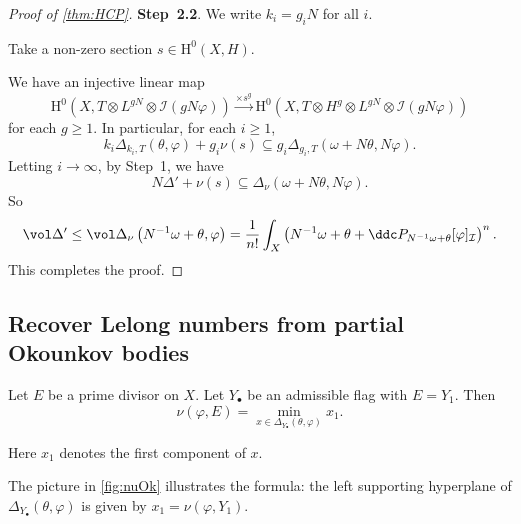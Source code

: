 \begin{proof}[Proof of \cref{thm:HCP}]
    \textbf{Step~2.2}. We write $k_i=g_i N$ for all $i$.

    Take a non-zero section $s\in \mathrm{H}^0(X,H)$.

    We have an injective linear map
    \[
        \mathrm{H}^0\left(X,T\otimes L^{gN}\otimes \mathcal{I}(gN\varphi)\right)\xrightarrow{\times s^g}\mathrm{H}^0\left(X,T\otimes H^g\otimes L^{gN}\otimes \mathcal{I}(gN\varphi)\right)
    \]
    for each $g\geq 1$.
    In particular, for each $i\geq 1$,
    \[
        k_i\Delta_{k_i,T}(\theta,\varphi)+g_i\nu(s)\subseteq g_i\Delta_{g_i,T}\left(\omega+N\theta,N\varphi\right).
    \]
    Letting $i\to\infty$, by Step~1, we have
    \[
        N\Delta' + \nu(s) \subseteq \Delta_{\nu}(\omega+N\theta,N\varphi).
    \]
    So
    \[
        \vol \Delta'\leq \vol \Delta_{\nu}\left(N^{-1}\omega+\theta,\varphi\right)=\frac{1}{n!}\int_X \left(N^{-1}\omega+\theta+\ddc P_{N^{-1}\omega+\theta}[\varphi]_{\mathcal{I}}\right)^n.
    \]
    This completes the proof.
\end{proof}



\subsection{Recover Lelong numbers from partial Okounkov bodies}
\label{subsec:pob_lelong}



\begin{theorem}\label{thm:nuOk}
	Let $E$ be a prime divisor on $X$. Let $Y_{\bullet}$ be an admissible flag with $E=Y_1$. Then
	\begin{equation}\label{eq:numinOk}
		\nu(\varphi,E)=\min_{x\in \Delta_{Y_{\bullet}}(\theta,\varphi)}x_1.
	\end{equation}
\end{theorem}
Here $x_1$ denotes the first component of $x$.

The picture in \cref{fig:nuOk} illustrates the formula: the left supporting hyperplane of $\Delta_{Y_{\bullet}}(\theta,\varphi)$ is given by $x_1=\nu(\varphi,Y_1)$.

